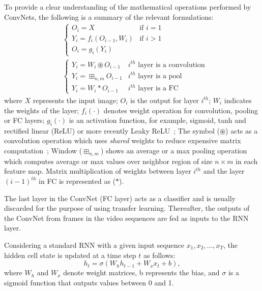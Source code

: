 \documentclass[fleqn,10pt]{wlscirep}
\begin{document}
To provide a clear understanding of the mathematical operations performed by ConvNets, the following is a summary of the relevant formulations:
\begin{align}
& \begin{cases}
      O_{i}=X & \text{if $i=1$}\\
      Y_{i}=f_{i}(O_{i-1},W_{i}) & \text{if $i>1$}\\
      O_{i}=g_{i}(Y_{i})
  \end{cases} \\
& \begin{cases}
      Y_{i}=W_{i} \circledast O_{i-1} & \text{$i^{th}$ layer is a convolution}\\
      Y_{i}=\boxplus_{n,m} O_{i-1} & \text{$i^{th}$ layer is a pool}\\
      Y_{i}=W_{i}*O_{i-1} & \text{$i^{th}$ layer is a FC}      
  \end{cases}         
\end{align}
where $X$ represents the input image; $O_{i}$ is the output for layer $i^{th}$; $W_{i}$ indicates the weights of the layer; $f_{i}(\cdot)$ denotes weight operation for convolution, pooling or FC layers; $g_{i}(\cdot)$ is an activation function, for example, sigmoid, tanh and rectified linear (ReLU) or more recently Leaky ReLU~\cite{maas2013rectifier}; The symbol ($\circledast$) acts as a convolution operation which uses \textit{shared} weights to reduce expensive matrix computation~\cite{lecun2010convolutional}; Window ($\boxplus_{n,m}$) shows an average or a max pooling operation which computes average or max values over neighbor region of size $n \times m$ in each feature map. Matrix multiplication of weights between layer $i^{th}$ and the layer $(i-1)^{th}$ in FC is represented as ($*$).

The last layer in the ConvNet (FC layer) acts as a classifier and is usually discarded for the purpose of using transfer learning. Thereafter, the outputs of the ConvNet from frames in the video sequences are fed as inputs to the RNN layer.

Considering a standard RNN with a given input sequence ${x_1, x_2,...,x_T}$, the hidden cell state is updated at a time step $t$ as follows:
\begin{equation}
h_t=\sigma(W_h h_{t-1}+W_x x_t+b),
\end{equation}
where $W_h$ and $W_x$ denote weight matrices, b represents the bias, and $\sigma$ is a sigmoid function that outputs values between 0 and 1.
\end{document}
